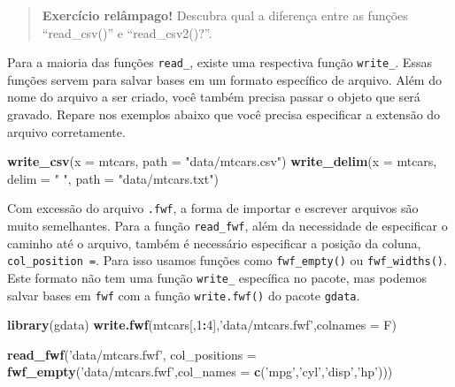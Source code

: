 \documentclass[]{book}
\newenvironment{Shaded}{\begin{snugshade}}{\end{snugshade}}
\newcommand{\DataTypeTok}[1]{\textcolor[rgb]{0.13,0.29,0.53}{#1}}
\newcommand{\DecValTok}[1]{\textcolor[rgb]{0.00,0.00,0.81}{#1}}
\newcommand{\KeywordTok}[1]{\textcolor[rgb]{0.13,0.29,0.53}{\textbf{#1}}}
\newcommand{\NormalTok}[1]{#1}
\newcommand{\OperatorTok}[1]{\textcolor[rgb]{0.81,0.36,0.00}{\textbf{#1}}}
\newcommand{\StringTok}[1]{\textcolor[rgb]{0.31,0.60,0.02}{#1}}
\begin{document}
\begin{quote}
\textbf{Exercício relâmpago!} Descubra qual a diferença entre as funções ``read\_csv()'' e ``read\_csv2()?''.
\end{quote}

Para a maioria das funções \texttt{read\_}, existe uma respectiva função \texttt{write\_}. Essas funções servem para salvar bases em um formato específico de arquivo. Além do nome do arquivo a ser criado, você também precisa passar o objeto que será gravado. Repare nos exemplos abaixo que você precisa especificar a extensão do arquivo corretamente.

\begin{Shaded}
\begin{Highlighting}[]
\KeywordTok{write_csv}\NormalTok{(}\DataTypeTok{x =}\NormalTok{ mtcars, }\DataTypeTok{path =} \StringTok{"data/mtcars.csv"}\NormalTok{)}
\KeywordTok{write_delim}\NormalTok{(}\DataTypeTok{x =}\NormalTok{ mtcars, }\DataTypeTok{delim =} \StringTok{" "}\NormalTok{, }\DataTypeTok{path =} \StringTok{"data/mtcars.txt"}\NormalTok{)}
\end{Highlighting}
\end{Shaded}

Com excessão do arquivo \texttt{.fwf}, a forma de importar e escrever arquivos são muito semelhantes. Para a função \texttt{read\_fwf}, além da necessidade de especificar o caminho até o arquivo, também é necessário especificar a posição da coluna, \texttt{col\_position\ =}. Para isso usamos funções como \texttt{fwf\_empty()} ou \texttt{fwf\_widths()}. Este formato não tem uma função \texttt{write\_} específica no pacote, mas podemos salvar bases em \texttt{fwf} com a função \texttt{write.fwf()} do pacote \texttt{gdata}.

\begin{Shaded}
\begin{Highlighting}[]
\KeywordTok{library}\NormalTok{(gdata)}
\KeywordTok{write.fwf}\NormalTok{(mtcars[,}\DecValTok{1}\OperatorTok{:}\DecValTok{4}\NormalTok{],}\StringTok{'data/mtcars.fwf'}\NormalTok{,}\DataTypeTok{colnames =}\NormalTok{ F)}

\KeywordTok{read_fwf}\NormalTok{(}\StringTok{'data/mtcars.fwf'}\NormalTok{, }\DataTypeTok{col_positions =} \KeywordTok{fwf_empty}\NormalTok{(}\StringTok{'data/mtcars.fwf'}\NormalTok{,}\DataTypeTok{col_names =} \KeywordTok{c}\NormalTok{(}\StringTok{'mpg'}\NormalTok{,}\StringTok{'cyl'}\NormalTok{,}\StringTok{'disp'}\NormalTok{,}\StringTok{'hp'}\NormalTok{)))}
\end{Highlighting}
\end{Shaded}
\end{document}
